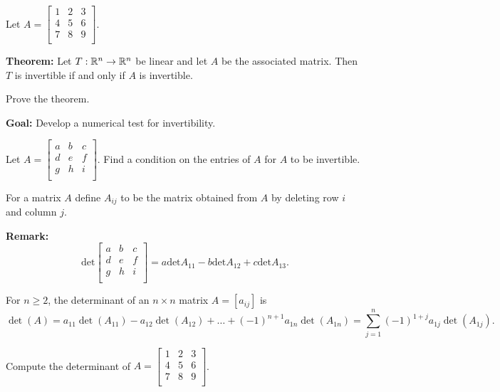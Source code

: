 \documentclass[12pt,letterpaper]{article}
\begin{document}
\begin{enumerate}
\vfill

\Part Let $A=\begin{bmatrix}
1 &2 & 3\\
4 &5 & 6\\
7 & 8 & 9\\
\end{bmatrix}$.

\vfill

\newpage

{\bf Theorem:} Let $T: \mathbb{R}^n \to \mathbb{R}^n$ be linear and let $A$ be the associated matrix. Then $T$ is invertible if and only if $A$ is invertible.

\Problem Prove the theorem.

\newpage

{\bf Goal:} Develop a numerical test for invertibility.

\Problem Let $A=\begin{bmatrix}
a & b & c\\
d & e &f\\
g & h & i\\
\end{bmatrix}$. Find a condition on the entries of $A$ for $A$ to be invertible.

\newpage

\begin{defn}
For a matrix $A$ define  $A_{ij}$ to be the matrix obtained from $A$ by deleting row $i$ and column $j$.
\end{defn}

{\bf Remark:} $$\text{det} \begin{bmatrix}
a & b & c\\
d & e &f\\
g & h & i\\
\end{bmatrix} = a \text{det} A_{11} - b \text{det} A_{12} +c \text{det} A_{13}.$$

\begin{defn}
For $n\geq 2$, the determinant of an $n\times n$ matrix $A=[a_{ij}]$ is
\begin{equation*}
\operatorname{det}(A)= a_{11} \operatorname{det}(A_{11}) - a_{12} \operatorname{det}(A_{12})+\dots + (-1)^{n+1} a_{1n} \operatorname{det}(A_{1n})=\sum_{j=1}^{n}(-1)^{1+j}a_{1j} \operatorname{det}(A_{1j}).
\end{equation*}
\end{defn}

\Problem Compute the determinant of $A=\begin{bmatrix}
1 & 2 &3\\
4 & 5 &6\\
7 & 8 & 9\\
\end{bmatrix}$.


\end{enumerate}
\end{document}
